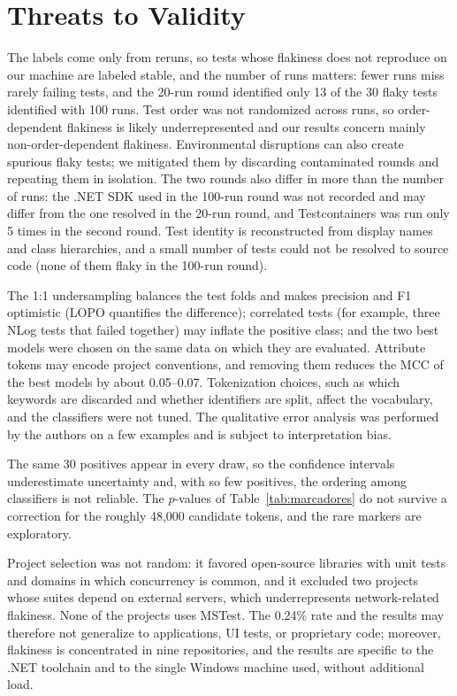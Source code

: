 \section{Threats to Validity}
\label{sec:threats}

 The labels come only from reruns, so tests whose flakiness does not reproduce on our machine are labeled stable, and the number of runs matters: fewer runs miss rarely failing tests, and the 20-run round identified only 13 of the 30 flaky tests identified with 100 runs. Test order was not randomized across runs, so order-dependent flakiness is likely underrepresented and our results concern mainly non-order-dependent flakiness.  Environmental disruptions can also create spurious flaky tests; we mitigated them by discarding contaminated rounds and repeating them in isolation. The two rounds also differ in more than the number of runs: the .NET SDK used in the 100-run round was not recorded and may differ from the one resolved in the 20-run round, and Testcontainers was run only 5 times in the second round. Test identity is reconstructed from display names and class hierarchies, and a small number of tests could not be resolved to source code (none of them flaky in the 100-run round).

 The 1:1 undersampling balances the test folds and makes precision and F1 optimistic (LOPO quantifies the difference); correlated tests (for example, three NLog tests that failed together) may inflate the positive class; and the two best models were chosen on the same data on which they are evaluated. Attribute tokens may encode project conventions, and removing them reduces the MCC of the best models by about 0.05--0.07. Tokenization choices, such as which keywords are discarded and whether identifiers are split, affect the vocabulary, and the classifiers were not tuned. The qualitative error analysis was performed by the authors on a few examples and is subject to interpretation bias.

 The same 30 positives appear in every draw, so the confidence intervals underestimate uncertainty and, with so few positives, the ordering among classifiers is not reliable. The $p$-values of Table~\ref{tab:marcadores} do not survive a correction for the roughly 48,000 candidate tokens, and the rare markers are exploratory.

 Project selection was not random: it favored open-source libraries with unit tests and domains in which concurrency is common, and it excluded two projects whose suites depend on external servers, which underrepresents network-related flakiness. None of the projects uses MSTest. The 0.24\% rate and the results may therefore not generalize to applications, UI tests, or proprietary code; moreover, flakiness is concentrated in nine repositories, and the results are specific to the .NET toolchain and to the single Windows machine used, without additional load.

